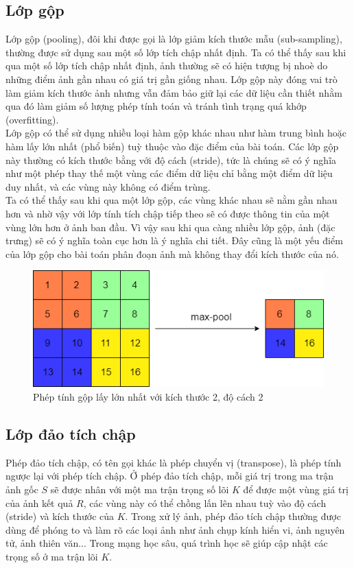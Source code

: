 \subsection{Lớp gộp}
Lớp gộp (pooling), đôi khi được gọi là lớp giảm kích thước mẫu (sub-sampling), thường được sử dụng sau một số lớp tích chập nhất định. Ta có thể thấy sau khi qua một số lớp tích chập nhất định, ảnh thường sẽ có hiện tượng bị nhoè do những điểm ảnh gần nhau có giá trị gần giống nhau. Lớp gộp này đóng vai trò làm giảm kích thước ảnh nhưng vẫn đảm bảo giữ lại các dữ liệu cần thiết nhằm qua đó làm giảm số lượng phép tính toán và tránh tình trạng quá khớp (overfitting).\\
Lớp gộp có thể sử dụng nhiều loại hàm gộp khác nhau như hàm trung bình hoặc hàm lấy lớn nhất (phổ biến) tuỳ thuộc vào đặc điểm của bài toán. Các lớp gộp này thường có kích thước bằng với độ cách (stride), tức là chúng sẽ có ý nghĩa như một phép thay thế một vùng các điểm dữ liệu chỉ bằng một điểm dữ liệu duy nhất, và các vùng này không có điểm trùng.\\
Ta có thể thấy sau khi qua một lớp gộp, các vùng khác nhau sẽ nằm gần nhau hơn và nhờ vậy với lớp tính tích chập tiếp theo sẽ có được thông tin của một vùng lớn hơn ở ảnh ban đầu. Vì vậy sau khi qua càng nhiều lớp gộp, ảnh (đặc trưng) sẽ có ý nghĩa toàn cục hơn là ý nghĩa chi tiết. Đây cũng là một yếu điểm của lớp gộp cho bài toán phân đoạn ảnh mà không thay đổi kích thước của nó.

\begin{figure}[h]
\centering
    \includegraphics[totalheight=3.5cm]{Images/max-pool.png}
    \caption{Phép tính gộp lấy lớn nhất với kích thước 2, độ cách 2}
    \label{poolExample}
\end{figure}

\subsection{Lớp đảo tích chập}
Phép đảo tích chập, có tên gọi khác là phép chuyển vị (transpose), là phép tính ngược lại với phép tích chập. Ở phép đảo tích chập, mỗi giá trị trong ma trận ảnh gốc $S$ sẽ được nhân với một ma trận trọng số lõi $K$ để được một vùng giá trị của ảnh kết quả $R$, các vùng này có thể chồng lấn lên nhau tuỳ vào độ cách (stride) và kích thước của $K$. Trong xử lý ảnh, phép đảo tích chập thường được dùng để phóng to và làm rõ các loại ảnh như ảnh chụp kính hiển vi, ảnh nguyên tử, ảnh thiên văn...  Trong mạng học sâu, quá trình học sẽ giúp cập nhật các trọng số ở ma trận lõi $K$.

